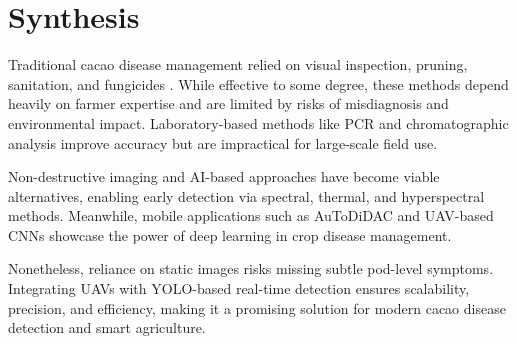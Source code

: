 \section{Synthesis}
Traditional cacao disease management relied on visual inspection, pruning, sanitation, and fungicides \cite{Merga2022}. While effective to some degree, these methods depend heavily on farmer expertise and are limited by risks of misdiagnosis and environmental impact. Laboratory-based methods like PCR and chromatographic analysis \cite{Nguyen2022,Quelal2020} improve accuracy but are impractical for large-scale field use.

Non-destructive imaging and AI-based approaches \cite{Alvarado2023,Silva2024} have become viable alternatives, enabling early detection via spectral, thermal, and hyperspectral methods. Meanwhile, mobile applications such as AuToDiDAC \cite{Tan2018} and UAV-based CNNs \cite{Tovurawa2025} showcase the power of deep learning in crop disease management.

Nonetheless, reliance on static images risks missing subtle pod-level symptoms. Integrating UAVs with YOLO-based real-time detection ensures scalability, precision, and efficiency, making it a promising solution for modern cacao disease detection and smart agriculture.
